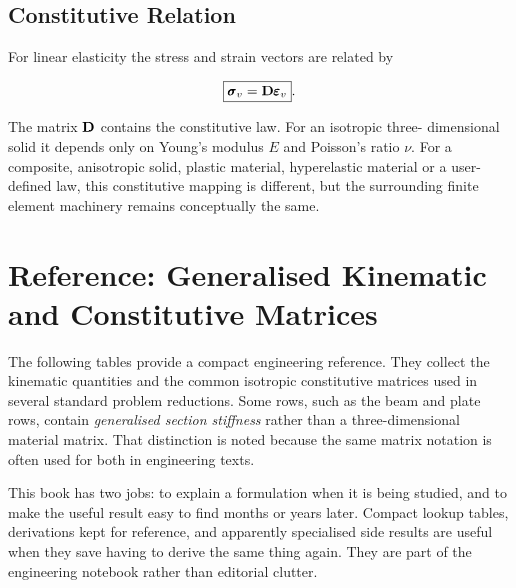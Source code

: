 \subsection{Constitutive Relation}

For linear elasticity the stress and strain vectors are related by

\begin{equation}\label{eq:linear-constitutive}
    \boxed{
    \pmb{\sigma}_v=\mathbf{D}\pmb{\varepsilon}_v
    }.
\end{equation}

The matrix $\mathbf{D}$ contains the constitutive law. For an isotropic three-
dimensional solid it depends only on Young's modulus $E$ and Poisson's ratio
$\nu$. For a composite, anisotropic solid, plastic material, hyperelastic
material or a user-defined law, this constitutive mapping is different, but the
surrounding finite element machinery remains conceptually the same.

\section[Reference Matrices]{Reference: Generalised Kinematic and Constitutive Matrices}

The following tables provide a compact engineering reference. They collect the kinematic quantities and the common isotropic
constitutive matrices used in several standard problem reductions. Some rows,
such as the beam and plate rows, contain \textit{generalised section stiffness}
rather than a three-dimensional material matrix. That distinction is noted
because the same matrix notation is often used for both in engineering texts.

\begin{notebooknote}
This book has two jobs: to explain a formulation when it is being studied, and
to make the useful result easy to find months or years later.  Compact lookup
tables, derivations kept for reference, and apparently specialised side results
are useful when they save having to derive the same thing again.
They are part of the engineering notebook rather than editorial clutter.
\end{notebooknote}

